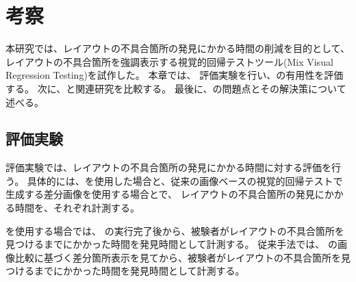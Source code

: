 \chapter{考察}\label{cha:discussion}
本研究では、レイアウトの不具合箇所の発見にかかる時間の削減を目的として、
レイアウトの不具合箇所を強調表示する視覚的回帰テストツール\toolName(Mix Visual Regression Testing)を試作した。
本章では、
評価実験を行い、\toolName の有用性を評価する。
次に、\toolName と関連研究を比較する。
最後に、\toolName の問題点とその解決策について述べる。

\section{評価実験}
評価実験では、レイアウトの不具合箇所の発見にかかる時間に対する評価を行う。
具体的には、\toolName を使用した場合と、従来の画像ベースの視覚的回帰テストで生成する差分画像を使用する場合とで、
レイアウトの不具合箇所の発見にかかる時間を、それぞれ計測する。

\toolName を使用する場合では、
\toolName の実行完了後から、被験者がレイアウトの不具合箇所を見つけるまでにかかった時間を発見時間として計測する。
従来手法では、
\toolName の画像比較に基づく差分箇所表示を見てから、被験者がレイアウトの不具合箇所を見つけるまでにかかった時間を発見時間として計測する。

